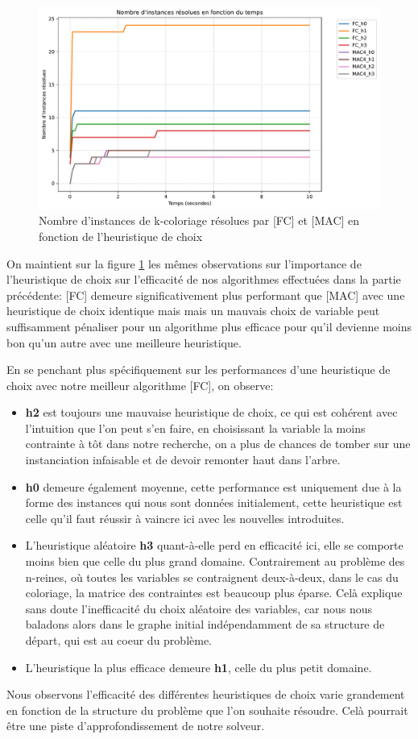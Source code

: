 \documentclass[14pt]{article}
\begin{document}
\begin{figure}[H]
	\centering
	\includegraphics[width=1\textwidth]{Images/graph_coloring-h.pdf}
	\caption{Nombre d'instances de k-coloriage résolues par [FC] et [MAC] en fonction de l'heuristique de choix}
	\label{fig:coloriage-h}
\end{figure}

On maintient sur la figure \ref{fig:coloriage-h} les mêmes observations sur l'importance de l'heuristique de choix sur l'efficacité de nos algorithmes effectuées dans la partie précédente: [FC] demeure significativement plus performant que [MAC] avec une heuristique de choix identique mais mais un mauvais choix de variable peut suffisamment pénaliser pour un algorithme plus efficace pour qu'il devienne moins bon qu'un autre avec une meilleure heuristique.

En se penchant plus spécifiquement sur les performances d'une heuristique de choix avec notre meilleur algorithme [FC], on observe:
\begin{itemize}
	\item \textbf{h2} est toujours une mauvaise heuristique de choix, ce qui est cohérent avec l'intuition que l'on peut s'en faire, en choisissant la variable la moins contrainte à tôt dans notre recherche, on a plus de chances de tomber sur une instanciation infaisable et de devoir remonter haut dans l'arbre.
	\item \textbf{h0} demeure également moyenne, cette performance est uniquement due à la forme des instances qui nous sont données initialement, cette heuristique est celle qu'il faut réussir à vaincre ici avec les nouvelles introduites.
	\item L'heuristique aléatoire \textbf{h3} quant-à-elle perd en efficacité ici, elle se comporte moins bien que celle du plus grand domaine. Contrairement au problème des n-reines, où toutes les variables se contraignent deux-à-deux, dans le cas du coloriage, la matrice des contraintes est beaucoup plus éparse. Celà explique sans doute l'inefficacité du choix aléatoire des variables, car nous nous baladons alors dans le graphe initial indépendamment de sa structure de départ, qui est au coeur du problème.
	\item L'heuristique la plus efficace demeure \textbf{h1}, celle du plus petit domaine.
\end{itemize}

Nous observons l'efficacité des différentes heuristiques de choix varie grandement en fonction de la structure du problème que l'on souhaite résoudre. Celà pourrait être une piste d'approfondissement de notre solveur.
\end{document}
